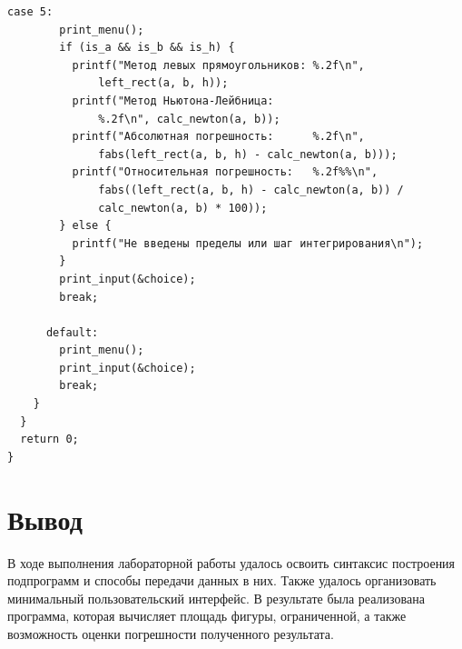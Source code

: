 \documentclass[a4paper,14pt]{extarticle}
\begin{document}
\begin{Verbatim}[tabsize=2]
      case 5:
        print_menu();
        if (is_a && is_b && is_h) {
          printf("Метод левых прямоугольников: %.2f\n", 
              left_rect(a, b, h));
          printf("Метод Ньютона-Лейбница:      
              %.2f\n", calc_newton(a, b));
          printf("Абсолютная погрешность:      %.2f\n", 
              fabs(left_rect(a, b, h) - calc_newton(a, b)));
          printf("Относительная погрешность:   %.2f%%\n",
              fabs((left_rect(a, b, h) - calc_newton(a, b)) /
              calc_newton(a, b) * 100));
        } else {
          printf("Не введены пределы или шаг интегрирования\n");
        }
        print_input(&choice);
        break;
      
      default:
        print_menu();
        print_input(&choice);
        break;
    }
  }
  return 0;
}
  \end{Verbatim}

  \section*{Вывод}
  В ходе выполнения лабораторной работы удалось освоить синтаксис построения подпрограмм и способы передачи данных в них. Также удалось организовать минимальный пользовательский интерфейс. В результате была реализована программа, которая вычисляет площадь фигуры, ограниченной, а также возможность оценки погрешности полученного результата. 
\end{document}
